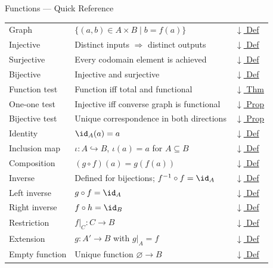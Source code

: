 \begin{toolkitbox}{Functions --- Quick Reference}
\begin{tabular}{l l l}
Graph             & $\{(a,b) \in A\times B \mid b = f(a)\}$                     & \hyperref[def:graph]{$\downarrow$ Def} \\
Injective         & Distinct inputs $\Rightarrow$ distinct outputs               & \hyperref[def:injective]{$\downarrow$ Def} \\
Surjective        & Every codomain element is achieved                          & \hyperref[def:surjective]{$\downarrow$ Def} \\
Bijective         & Injective and surjective                                    & \hyperref[def:bijective]{$\downarrow$ Def} \\
\midrule
Function test     & Function iff total and functional                           & \hyperref[thm:function-total-functional-characterization]{$\downarrow$ Thm} \\
One-one test      & Injective iff converse graph is functional                  & \hyperref[prop:one-to-one-converse-functional]{$\downarrow$ Prop} \\
Bijective test    & Unique correspondence in both directions                    & \hyperref[prop:bijection-unique-both-directions]{$\downarrow$ Prop} \\
\midrule
Identity          & $\id_A(a) = a$                                              & \hyperref[def:identity]{$\downarrow$ Def} \\
Inclusion map     & $\iota : A \hookrightarrow B$, $\iota(a) = a$ for $A \subseteq B$ & \hyperref[def:inclusion]{$\downarrow$ Def} \\
Composition       & $(g \circ f)(a) = g(f(a))$                                  & \hyperref[def:composition]{$\downarrow$ Def} \\
Inverse           & Defined for bijections; $f^{-1} \circ f = \id_A$            & \hyperref[def:inverse]{$\downarrow$ Def} \\
Left inverse      & $g\circ f=\id_A$                                           & \hyperref[def:left-inverse-function]{$\downarrow$ Def} \\
Right inverse     & $f\circ h=\id_B$                                           & \hyperref[def:right-inverse-function]{$\downarrow$ Def} \\
Restriction       & $f|_C : C \to B$                                            & \hyperref[def:restriction]{$\downarrow$ Def} \\
Extension         & $g : A' \to B$ with $g|_A = f$                              & \hyperref[def:fn-extension]{$\downarrow$ Def} \\
Empty function    & Unique function $\varnothing\to B$                          & \hyperref[def:empty-function]{$\downarrow$ Def} \\
\bottomrule
\end{tabular}
\end{toolkitbox}

